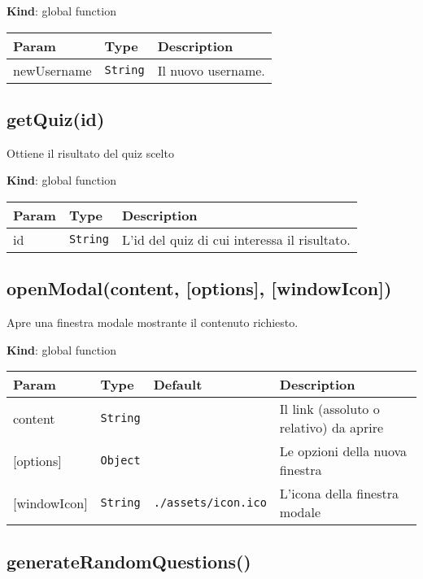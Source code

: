 \textbf{Kind}: global function

\begin{tabularx}{\textwidth}{XXX}
\toprule
Param & Type & Description\tabularnewline
\midrule
\endhead
newUsername & \texttt{String} & Il nuovo username.\tabularnewline
\bottomrule
\end{tabularx}

\protect\hypertarget{getQuiz}{}{}

\hypertarget{getquizid}{%
\subsection{getQuiz(id)}\label{getquizid}}

Ottiene il risultato del quiz scelto

\textbf{Kind}: global function

\begin{tabularx}{\textwidth}{XXX}
\toprule
Param & Type & Description\tabularnewline
\midrule
\endhead
id & \texttt{String} & L'id del quiz di cui interessa il
risultato.\tabularnewline
\bottomrule
\end{tabularx}

\protect\hypertarget{openModal}{}{}

\hypertarget{openmodalcontent-options-windowicon}{%
\subsection{openModal(content, {[}options{]},
{[}windowIcon{]})}\label{openmodalcontent-options-windowicon}}

Apre una finestra modale mostrante il contenuto richiesto.

\textbf{Kind}: global function

\begin{tabularx}{\textwidth}{XXXX}
\toprule
Param & Type & Default & Description\tabularnewline
\midrule
\endhead
content & \texttt{String} & & Il link (assoluto o relativo) da
aprire\tabularnewline
{[}options{]} & \texttt{Object} & & Le opzioni della nuova
finestra\tabularnewline
{[}windowIcon{]} & \texttt{String} & \texttt{./assets/icon.ico} &
L'icona della finestra modale\tabularnewline
\bottomrule
\end{tabularx}

\protect\hypertarget{generateRandomQuestions}{}{}

\hypertarget{generaterandomquestions}{%
\subsection{generateRandomQuestions()}\label{generaterandomquestions}}


